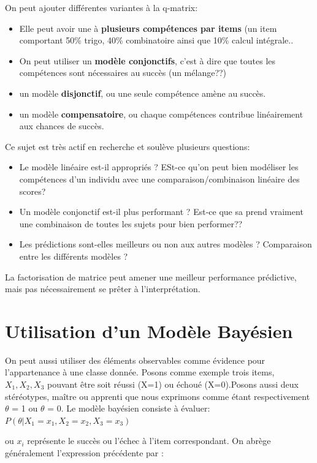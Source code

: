 \documentclass[oneside]{book}
\begin{document}
On peut ajouter différentes variantes à la q-matrix:
\begin{itemize}
\item Elle peut avoir une à \textbf{plusieurs compétences par items} (un item comportant 50\% trigo, 40\% combinatoire ainsi que 10\% calcul intégrale..
\item On peut utiliser un \textbf{modèle conjonctifs}, c'est à dire que toutes les compétences sont nécessaires au succès (un mélange??)
\item un modèle \textbf{disjonctif}, ou une seule compétence amène au succès.
\item un modèle \textbf{compensatoire}, ou chaque compétences contribue linéairement aux chances de succès.
\end{itemize}

Ce sujet est très actif en recherche et soulève plusieurs questions:
\begin{itemize}
\item Le modèle linéaire est-il appropriés ? ESt-ce qu'on peut bien modéliser les compétences d'un individu avec une comparaison/combinaison linéaire des scores?
\item Un modèle conjonctif est-il plus performant ? Est-ce que sa prend vraiment une combinaison de toutes les sujets pour bien performer??

\item Les prédictions sont-elles meilleurs ou non aux autres modèles ? Comparaison entre les différents modèles ?
\end{itemize}

La factorisation de matrice peut amener une meilleur performance prédictive, mais pas nécessairement se prêter à l'interprétation.
\section{Utilisation d'un Modèle Bayésien}
On peut aussi utiliser des éléments observables comme évidence pour l'appartenance à une classe donnée. Posons comme exemple trois items, $X_1, X_2, X_3$ pouvant être soit réussi (X=1) ou échoué (X=0).Posons aussi deux stéréotypes, maître ou apprenti que nous exprimons comme étant respectivement $\theta$ = 1 ou $\theta$ = 0. Le modèle bayésien consiste à évaluer:\\

\centering
$P(\theta | X_1 = x_1, X_2 = x_2, X_3 = x_3)$
\justify

ou $x_i$ représente le succès ou l'échec à l'item correspondant. On abrège généralement l'expression précédente par :\\
\end{document}
